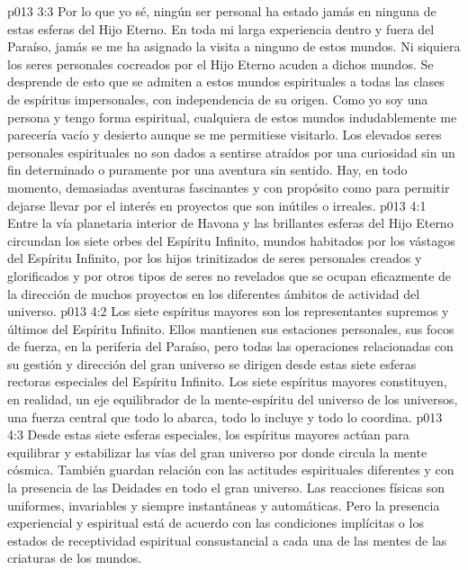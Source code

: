 \vs p013 3:3 \pc Por lo que yo sé, ningún ser personal ha estado jamás en ninguna de estas esferas del Hijo Eterno. En toda mi larga experiencia dentro y fuera del Paraíso, jamás se me ha asignado la visita a ninguno de estos mundos. Ni siquiera los seres personales cocreados por el Hijo Eterno acuden a dichos mundos. Se desprende de esto que se admiten a estos mundos espirituales a todas las clases de espíritus impersonales, con independencia de su origen. Como yo soy una persona y tengo forma espiritual, cualquiera de estos mundos indudablemente me parecería vacío y desierto aunque se me permitiese visitarlo. Los elevados seres personales espirituales no son dados a sentirse atraídos por una curiosidad sin un fin determinado o puramente por una aventura sin sentido. Hay, en todo momento, demasiadas aventuras fascinantes y con propósito como para permitir dejarse llevar por el interés en proyectos que son inútiles o irreales.
\vs p013 4:1 Entre la vía planetaria interior de Havona y las brillantes esferas del Hijo Eterno circundan los siete orbes del Espíritu Infinito, mundos habitados por los vástagos del Espíritu Infinito, por los hijos trinitizados de seres personales creados y glorificados y por otros tipos de seres no revelados que se ocupan eficazmente de la dirección de muchos proyectos en los diferentes ámbitos de actividad del universo.
\vs p013 4:2 Los siete espíritus mayores son los representantes supremos y últimos del Espíritu Infinito. Ellos mantienen sus estaciones personales, sus focos de fuerza, en la periferia del Paraíso, pero todas las operaciones relacionadas con su gestión y dirección del gran universo se dirigen desde estas siete esferas rectoras especiales del Espíritu Infinito. Los siete espíritus mayores constituyen, en realidad, un eje equilibrador de la mente\hyp{}espíritu del universo de los universos, una fuerza central que todo lo abarca, todo lo incluye y todo lo coordina.
\vs p013 4:3 Desde estas siete esferas especiales, los espíritus mayores actúan para equilibrar y estabilizar las vías del gran universo por donde circula la mente cósmica. También guardan relación con las actitudes espirituales diferentes y con la presencia de las Deidades en todo el gran universo. Las reacciones físicas son uniformes, invariables y siempre instantáneas y automáticas. Pero la presencia experiencial y espiritual está de acuerdo con las condiciones implícitas o los estados de receptividad espiritual consustancial a cada una de las mentes de las criaturas de los mundos.
